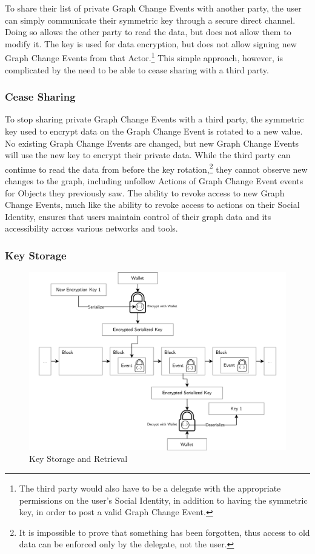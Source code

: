 \documentclass[12pt,letterpaper]{article}
\begin{document}
To share their list of private Graph Change Events with another party, the user can simply
communicate their symmetric key through a secure direct channel. Doing so allows the other
party to read the data, but does not allow them to modify it. The key is used for data
encryption, but does not allow signing new Graph Change Events from that Actor.\footnote{The
  third party would also have to be a delegate with the appropriate permissions on the
  user’s Social Identity, in addition to having the symmetric key, in order to post a valid
  Graph Change Event.} This simple approach, however, is complicated by the need to be able
to cease sharing with a third party.

\subsubsection{Cease Sharing}

To stop sharing private Graph Change Events with a third party, the symmetric key used to
encrypt data on the Graph Change Event is rotated to a new value. No existing Graph Change
Events are changed, but new Graph Change Events will use the new key to encrypt their
private data. While the third party can continue to read the data from before the key
rotation,\footnote{It is impossible to prove that something has been forgotten, thus access
  to old data can be enforced only by the delegate, not the user.} they cannot observe new
changes to the graph, including unfollow Actions of Graph Change Event events for Objects
they previously saw. The ability to revoke access to new Graph Change Events, much like the
ability to revoke access to actions on their Social Identity, ensures that users maintain
control of their graph data and its accessibility across various networks and tools.

\subsubsection{Key Storage}

\begin{figure}
	\includegraphics[width=\linewidth]{figures/Key Storage and Retrieval.png}
	\caption{Key Storage and Retrieval}
	\label{fig:4}
\end{figure}
\end{document}
